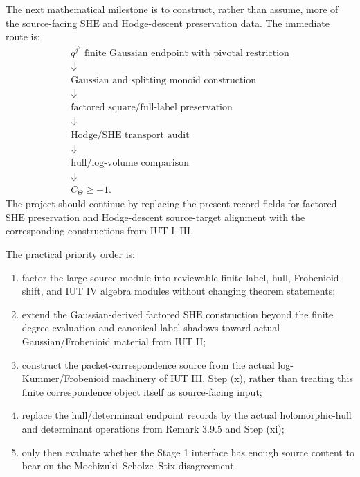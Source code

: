 \documentclass[11pt]{article}
\newcommand{\IUT}{IUT}
\newcommand{\SHE}{\ensuremath{\mathrm{SHE}}}
\theoremstyle{plain}
\theoremstyle{definition}
\theoremstyle{remark}
\begin{document}
The next mathematical milestone is to construct, rather than assume, more of
the source-facing \SHE{} and Hodge-descent preservation data.  The immediate
route is:
\[
\begin{array}{c}
q^{j^2}\text{ finite Gaussian endpoint with pivotal restriction}\\
\Downarrow\\
\text{Gaussian and splitting monoid construction}\\
\Downarrow\\
\text{factored square/full-label preservation}\\
\Downarrow\\
\text{Hodge/SHE transport audit}\\
\Downarrow\\
\text{hull/log-volume comparison}\\
\Downarrow\\
C_\Theta\ge -1 .
\end{array}
\]
The project should continue by replacing the present record fields for
factored \SHE{} preservation and Hodge-descent source-target alignment with
the corresponding constructions from \IUT{} I--III.

The practical priority order is:
\begin{enumerate}
\item factor the large source module into reviewable finite-label, hull,
  Frobenioid-shift, and \IUT{} IV algebra modules without changing theorem
  statements;
\item extend the Gaussian-derived factored \SHE{} construction beyond the
  finite degree-evaluation and canonical-label shadows toward actual
  Gaussian/Frobenioid material from \IUT{} II;
\item construct the packet-correspondence source from the actual
  log-Kummer/Frobenioid machinery of \IUT{} III, Step (x), rather than treating
  this finite correspondence object itself as source-facing input;
\item replace the hull/determinant endpoint records by the actual
  holomorphic-hull and determinant operations from Remark 3.9.5 and
  Step (xi);
\item only then evaluate whether the Stage 1 interface has enough source
  content to bear on the Mochizuki--Scholze--Stix disagreement.
\end{enumerate}
\end{document}
